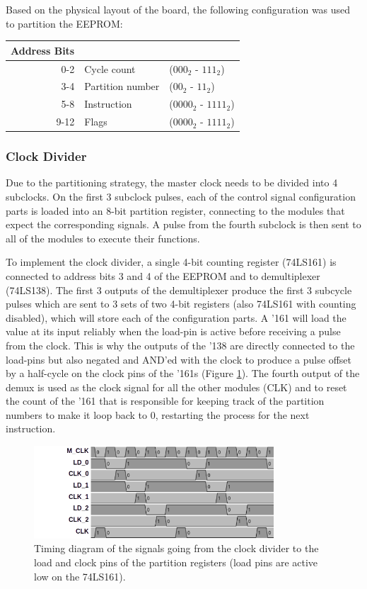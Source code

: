 Based on the physical layout of the board, the following configuration was used to partition the EEPROM:
\\
\begin{center}
\begin{tabular}{r|ll} 
  Address Bits & \\ \hline
  0-2  & Cycle count & ($000_2$ - $111_2$) \\
  3-4  & Partition number & ($00_2$ - $11_2$) \\
  5-8  & Instruction & ($0000_2$ - $1111_2$) \\
  9-12 & Flags & ($0000_2$ - $1111_2$) \\
\end{tabular}
\end{center}

\subsubsection{Clock Divider}
Due to the partitioning strategy, the master clock needs to be divided into 4 subclocks. On the first 3 subclock pulses, each of the control signal configuration parts is loaded into an 8-bit partition register, connecting to the modules that expect the corresponding signals. A pulse from the fourth subclock is then sent to all of the modules to execute their functions. 

To implement the clock divider, a single 4-bit counting register (74LS161) is connected to address bits 3 and 4 of the EEPROM and to demultiplexer (74LS138). The first 3 outputs of the demultiplexer produce the first 3 subcycle pulses which are sent to 3 sets of two 4-bit registers (also 74LS161 with counting disabled), which will store each of the configuration parts. A '161 will load the value at its input reliably when the load-pin is active before receiving a pulse from the clock. This is why the outputs of the '138 are directly connected to the load-pins but also negated and AND'ed with the clock to produce a pulse offset by a half-cycle on the clock pins of the '161s (Figure \ref{fig:partitioning}). The fourth output of the demux is used as the clock signal for all the other modules (CLK) and to reset the count of the '161 that is responsible for keeping track of the partition numbers to make it loop back to 0, restarting the process for the next instruction.

\begin{figure}[H]
  \centering
  \includegraphics[width=0.8\textwidth]{img/partitioning}
  \caption{Timing diagram of the signals going from the clock divider to the load and clock pins of the partition registers (load pins are active low on the 74LS161).}
  \label{fig:partitioning}
\end{figure}

